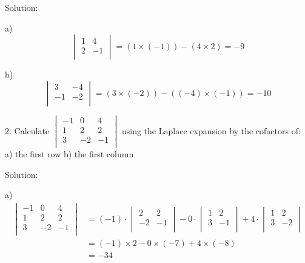 \documentclass{article}
\begin{document}
Solution:

a)
\[
  \begin{vmatrix}
    1 & 4 \\
    2 & -1 \\
  \end{vmatrix} = (1 \times (-1)) - (4 \times 2) = -9
\]

b)
\[
  \begin{vmatrix}
    3 & -4 \\
    -1 & -2 \\
  \end{vmatrix} = (3 \times (-2)) - ((-4) \times (-1)) = -10
\]

2. Calculate 
$\begin{vmatrix}
  -1 & 0 & 4 \\
  1 & 2 & 2 \\
  3 & -2 & -1 \\
\end{vmatrix}$ using the Laplace expansion by the cofactors of:\\
a) the first row \hspace{10px} b) the first column

Solution:

a)
\begin{equation*}
\begin{split}
  \begin{vmatrix}
    -1 & 0 & 4 \\
    1 & 2 & 2 \\
    3 & -2 & -1 \\
  \end{vmatrix} 
  &= (-1) \cdot \begin{vmatrix}
                  2 & 2 \\
                  -2 & -1 \\ 
                \end{vmatrix} -
     0 \cdot \begin{vmatrix}
               1 & 2 \\
               3 & -1 \\ 
             \end{vmatrix} +
     4 \cdot \begin{vmatrix}
               1 & 2 \\
               3 & -2 \\ 
             \end{vmatrix} \\ 
  &= (-1) \times 2 - 0 \times (-7) + 4 \times (-8) \\
  &= -34 \\
\end{split}
\end{equation*}
\end{document}
